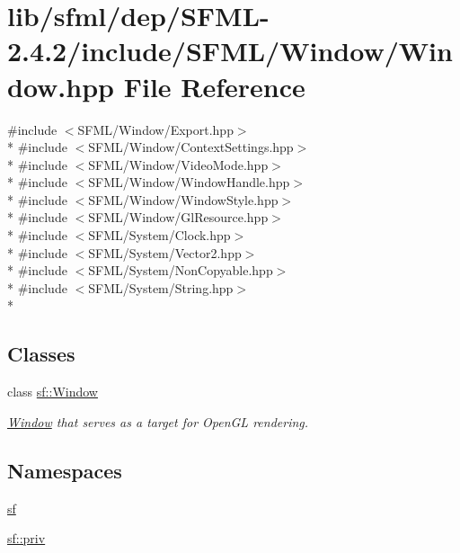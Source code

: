 \hypertarget{sfml_2dep_2_s_f_m_l-2_84_82_2include_2_s_f_m_l_2_window_2_window_8hpp}{\section{lib/sfml/dep/\-S\-F\-M\-L-\/2.4.2/include/\-S\-F\-M\-L/\-Window/\-Window.hpp File Reference}
\label{sfml_2dep_2_s_f_m_l-2_84_82_2include_2_s_f_m_l_2_window_2_window_8hpp}
}
{\ttfamily \#include $<$S\-F\-M\-L/\-Window/\-Export.\-hpp$>$}\\*
{\ttfamily \#include $<$S\-F\-M\-L/\-Window/\-Context\-Settings.\-hpp$>$}\\*
{\ttfamily \#include $<$S\-F\-M\-L/\-Window/\-Video\-Mode.\-hpp$>$}\\*
{\ttfamily \#include $<$S\-F\-M\-L/\-Window/\-Window\-Handle.\-hpp$>$}\\*
{\ttfamily \#include $<$S\-F\-M\-L/\-Window/\-Window\-Style.\-hpp$>$}\\*
{\ttfamily \#include $<$S\-F\-M\-L/\-Window/\-Gl\-Resource.\-hpp$>$}\\*
{\ttfamily \#include $<$S\-F\-M\-L/\-System/\-Clock.\-hpp$>$}\\*
{\ttfamily \#include $<$S\-F\-M\-L/\-System/\-Vector2.\-hpp$>$}\\*
{\ttfamily \#include $<$S\-F\-M\-L/\-System/\-Non\-Copyable.\-hpp$>$}\\*
{\ttfamily \#include $<$S\-F\-M\-L/\-System/\-String.\-hpp$>$}\\*
\subsection*{Classes}
\begin{DoxyCompactItemize}
\item 
class \hyperlink{classsf_1_1_window}{sf\-::\-Window}
\begin{DoxyCompactList}\small\item\em \hyperlink{classsf_1_1_window}{Window} that serves as a target for Open\-G\-L rendering. \end{DoxyCompactList}\end{DoxyCompactItemize}
\subsection*{Namespaces}
\begin{DoxyCompactItemize}
\item 
\hyperlink{namespacesf}{sf}
\item 
\hyperlink{namespacesf_1_1priv}{sf\-::priv}
\end{DoxyCompactItemize}
